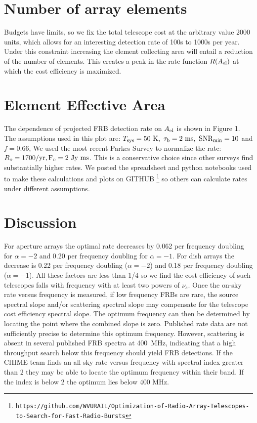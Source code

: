 \documentclass[fleqn,usenatbib]{mnras}
\begin{document}
\section{Number of array elements}

Budgets have limits, so we fix the total telescope cost at the arbitrary value 2000 units, which allows for an interesting detection rate of 100s to 1000s per year.  Under this constraint increasing the element collecting area will entail a reduction of the number of elements. This creates a peak in the rate function $R(A_{\rm{el}})$ at which the cost efficiency is maximized.

\section{Element Effective Area}

The dependence of projected FRB detection rate on $A_{\rm{el}}$ is shown in Figure 1. The assumptions used in this plot are: $T_{\rm{sys}}= 50~\rm{K},~ \tau_b = 2~\rm{ms},~ SNR_{min}=10$ and $f=0.66$, We used the most recent Parkes Survey to normalize the rate: $R_o = 1700 \rm{/yr} , F_o= 2~\rm{Jy~ms}$. This is a conservative choice since other surveys find substantially higher rates. We posted the spreadsheet and python notebooks used to make these calculations and plots on GITHUB \footnote{\texttt{https://github.com/WVURAIL/Optimization-of-Radio-Array-Telescopes-to-Search-for-Fast-Radio-Bursts} } so others can calculate rates under different assumptions. 
 
\section{Discussion}

For aperture arrays the optimal rate decreases by 0.062 per frequency doubling for $\alpha =-2$ and 0.20 per frequency doubling for  $\alpha =-1$.  For dish arrays the decrease is 0.22 per frequency doubling ($\alpha =-2$) and 0.18 per frequency doubling ($\alpha =-1$). All these factors are less than 1/4 so we find the cost efficiency of such telescopes falls with frequency with at least two powers of $\nu_s$. Once the on-sky rate versus frequency is measured, if low frequency FRBs are rare, the source spectral slope and/or scattering spectral slope may compensate for the telescope cost efficiency spectral slope. The optimum frequency can then be determined by locating the point where the combined slope is zero. Published rate data are not sufficiently precise to determine this optimum frequency. However, scattering is absent in several published FRB spectra at 400~MHz, indicating that a high throughput search below this frequency should yield FRB detections. 
If the CHIME team finds an all sky rate versus frequency with spectral index greater than 2 they may be able to locate the optimum frequency within their band. If the index is below 2 the optimum lies below 400 MHz. 
\end{document}
